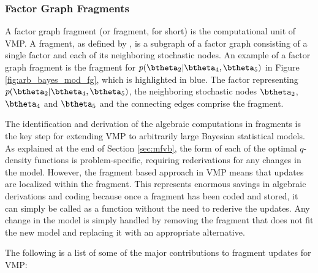 \documentclass[12pt]{article}
\theoremstyle{plain}
\theoremstyle{definition}
\theoremstyle{remark}
\begin{document}
\subsubsection{Factor Graph Fragments}
\label{sec:fg_frag}

A factor graph fragment (or fragment, for short) is the computational unit of VMP.
A fragment, as defined by ,
is a subgraph of a factor graph
consisting of a single factor and each of its neighboring stochastic nodes.
An example of a factor graph fragment is the fragment for $p (\btheta_2 | \btheta_4, \btheta_5)$ in Figure
\ref{fig:arb_bayes_mod_fg}, which is highlighted in blue. The factor representing $p (\btheta_2 | \btheta_4, \btheta_5)$,
the neighboring stochastic nodes $\btheta_2$, $\btheta_4$ and $\btheta_5$
and the connecting edges comprise the fragment.

The identification and derivation of the algebraic computations in fragments is the key step for extending VMP
to arbitrarily large Bayesian statistical models. As explained at the end of Section \ref{sec:mfvb}, the form of each of the
optimal $q$-density functions is problem-specific, requiring rederivations for any changes in the model. However,
the fragment based approach in VMP means that updates are localized within the fragment.
This represents enormous savings in algebraic derivations and coding because once a fragment has
been coded and stored, it can simply be called as a function without the need to rederive the updates.
Any change in the model is simply handled by removing the fragment that does not fit the new model and replacing
it with an appropriate alternative.

The following is a list of some of the major contributions to fragment updates for VMP:
\end{document}
